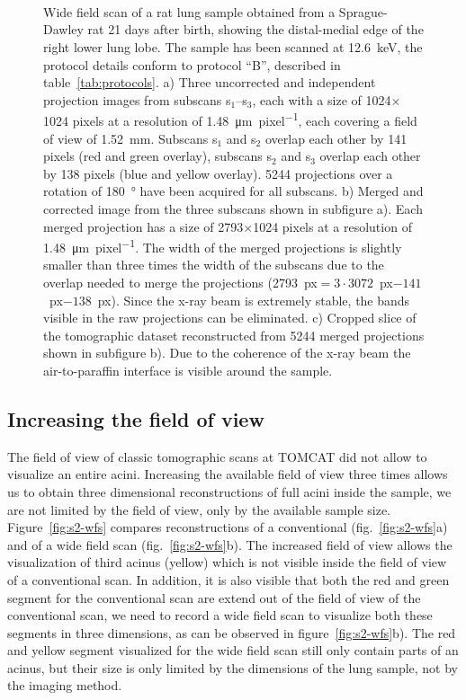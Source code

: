 	\begin{figure}[htp]
		\\%
		\\%
		\\%
			\caption{Wide field scan of a rat lung sample obtained from a Sprague-Dawley rat 21 days after birth, showing the distal-medial edge of the right lower lung lobe. The sample has been scanned at \SI{12.6}{\kilo\electronvolt}, the protocol details conform to protocol ``B'', described in table~\ref{tab:protocols}. %
		a) Three uncorrected and independent projection images from subscans s$_1$--s$_3$, each with a size of 1024\(\times\)1024 pixels at a resolution of \SI{1.48}{\micro\meter\per pixel}, each covering a field of view of \SI{1.52}{\milli\meter}. Subscans s$_1$ and s$_2$ overlap each other by 141 pixels (red and green overlay), subscans s$_2$ and s$_3$ overlap each other by 138 pixels (blue and yellow overlay). 5244 projections over a rotation of \SI{180}{\degree} have been acquired for all subscans. %
		b) Merged and corrected image from the three subscans shown in subfigure a). Each merged projection has a size of 2793\(\times\)1024 pixels at a resolution of \SI{1.48}{\micro\meter\per pixel}. The width of the merged projections is slightly smaller than three times the width of the subscans due to the overlap needed to merge the projections (2793~px$=3\cdot3072$~px$-141$~px$-138$~px). Since the x-ray beam is extremely stable, the bands visible in the raw projections can be eliminated. %
		c) Cropped slice of the tomographic dataset reconstructed from 5244 merged projections shown in subfigure b). Due to the coherence of the x-ray beam the air-to-paraffin interface is visible around the sample.%
		}%
		\label{fig:wide field scan results}%
	\end{figure}
\fi

\subsection{Increasing the field of view}
The field of view of classic tomographic scans at TOMCAT did not allow to visualize an entire acini. Increasing the available field of view three times allows us to obtain three dimensional reconstructions of full acini inside the sample, we are not limited by the field of view, only by the available sample size. Figure~\ref{fig:s2-wfs} compares reconstructions of a conventional (fig.~\ref{fig:s2-wfs}a) and of a wide field scan (fig.~\ref{fig:s2-wfs}b). The increased field of view allows the visualization of third acinus (yellow) which is not visible inside the field of view of a conventional scan. In addition, it is also visible that both the red and green segment for the conventional scan are extend out of the field of view of the conventional scan, we need to record a wide field scan to visualize both these segments in three dimensions, as can be observed in figure~\ref{fig:s2-wfs}b). The red and yellow segment visualized for the wide field scan still only contain parts of an acinus, but their size is only limited by the dimensions of the lung sample, not by the imaging method.


